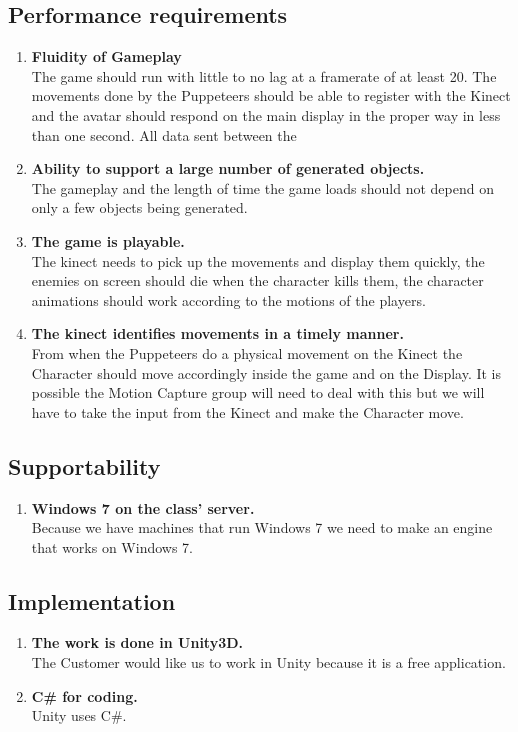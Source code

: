 \documentclass[10pt,letterpaper,oneside,english]{report}
\begin{document}
\subsection{Performance requirements}
\begin{enumerate}
\item \textbf{Fluidity of Gameplay} \\ The game should run with little to no lag at a framerate of at least 20. The movements done by the Puppeteers should be able to register with the Kinect and the avatar should respond on the main display in the proper way in less than one second. All data sent between the   
\item \textbf{Ability to support a large number of generated objects.} \\
The gameplay and the length of time the game loads should not depend on only a few objects being generated.

\item \textbf{The game is playable.} \\ The kinect needs to pick up the movements and display them quickly, the enemies on screen should die when the character kills them, the character animations should work according to the motions of the players.

\item \textbf{The kinect identifies movements in a timely manner.} \\ From when the Puppeteers do a physical movement on the Kinect the Character should move accordingly inside the game and on the Display. It is possible the Motion Capture group will need to deal with this but we will have to take the input from the Kinect and make the Character move.
\end{enumerate}
\subsection{Supportability}
\begin{enumerate}
\item \textbf{Windows 7 on the class’ server.} \\ Because we have machines that run Windows 7 we need to make an engine that works on Windows 7.

\end{enumerate}
\subsection{Implementation}
\begin{enumerate}
\item \textbf{The work is done in Unity3D.} \\ The Customer would like us to work in Unity because it is a free application.
\item \textbf{C\# for coding.} \\ Unity uses C\#.
\end{enumerate}
\end{document}
